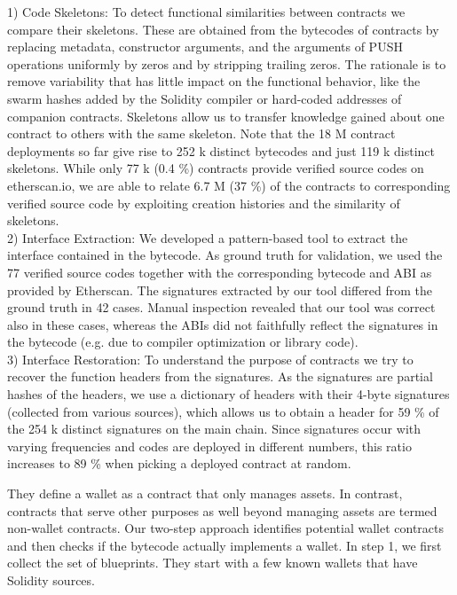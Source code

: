 \documentclass[12pt]{article}
\begin{document}
1) Code Skeletons: To detect functional similarities between contracts we compare their skeletons. These are obtained from the bytecodes of contracts by replacing metadata, constructor arguments, and the arguments of PUSH
operations uniformly by zeros and by stripping trailing zeros.
The rationale is to remove variability that has little impact
on the functional behavior, like the swarm hashes added by
the Solidity compiler or hard-coded addresses of companion
contracts. Skeletons allow us to transfer knowledge gained
about one contract to others with the same skeleton. Note
that the 18 M contract deployments so far give rise to 252 k
distinct bytecodes and just 119 k distinct skeletons. While
only 77 k (0.4 \%) contracts provide verified source codes on
etherscan.io, we are able to relate 6.7 M (37 \%) of the
contracts to corresponding verified source code by exploiting
creation histories and the similarity of skeletons.
\\
2) Interface Extraction: We developed a pattern-based tool
to extract the interface contained in the bytecode. As ground
truth for validation, we used the 77  verified source codes
together with the corresponding bytecode and ABI as provided
by Etherscan. The signatures extracted by our tool differed
from the ground truth in 42 cases. Manual inspection revealed
that our tool was correct also in these cases, whereas the ABIs
did not faithfully reflect the signatures in the bytecode (e.g.
due to compiler optimization or library code).
\\
3) Interface Restoration: To understand the purpose of
contracts we try to recover the function headers from the
signatures. As the signatures are partial hashes of the headers,
we use a dictionary of headers with their 4-byte signatures
(collected from various sources), which allows us to obtain a
header for 59 \% of the 254 k distinct signatures on the main
chain. Since signatures occur with varying frequencies and
codes are deployed in different numbers, this ratio increases
to 89 \% when picking a deployed contract at random.
\par
They define a wallet as a contract that only manages assets.
In contrast, contracts that serve other purposes as well beyond
managing assets are termed non-wallet contracts.
Our two-step approach identifies potential wallet contracts
and then checks if the bytecode actually implements a wallet.
In step 1, we first collect the set of blueprints. They start with
a few known wallets that have Solidity sources.

 
\end{document}

